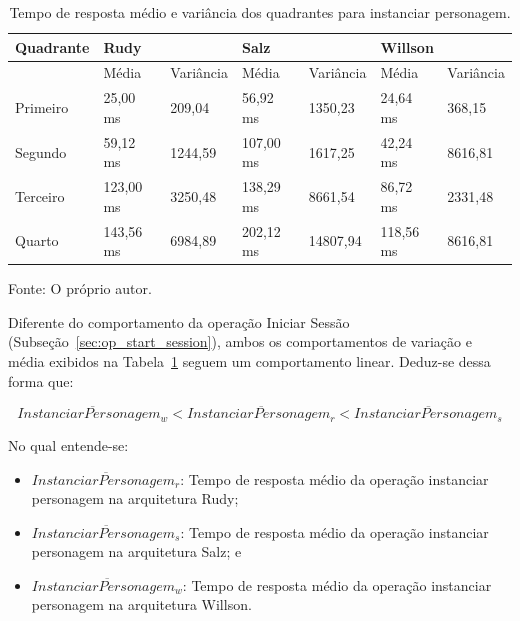 \begin{table}[htb!]
\centering
\begin{adjustbox}{max width=\textwidth}
\caption{Tempo de resposta médio e variância dos quadrantes para instanciar personagem.}
\label{tab:op_spawn_character}
\begin{tabular}{l||l|l||l|l||l|l}

\hline \hline

Quadrante & \multicolumn{2}{l||}{Rudy}    & \multicolumn{2}{l||}{Salz}    & \multicolumn{2}{l}{Willson} \\ \hline \hline

& Média & Variância & Média & Variância & Média & Variância \\ \hline

Primeiro  & 25,00 ms & 209,04 & 56,92 ms & 1350,23 & 24,64 ms & 368,15 \\ \hline

Segundo  & 59,12 ms & 1244,59 & 107,00 ms & 1617,25 & 42,24 ms & 8616,81 \\ \hline

Terceiro  & 123,00 ms & 3250,48 & 138,29 ms & 8661,54 & 86,72 ms & 2331,48 \\ \hline

Quarto  & 143,56 ms & 6984,89 & 202,12 ms & 14807,94 & 118,56 ms & 8616,81 \\ \hline \hline

\end{tabular}

\end{adjustbox}

Fonte: O próprio autor.
\end{table}

Diferente do comportamento da operação Iniciar Sessão (Subseção~\ref{sec:op_start_session}), ambos os comportamentos de variação e média exibidos na Tabela~\ref{tab:op_spawn_character} seguem um comportamento linear.
%
Deduz-se dessa forma que:

$$
  \overline{InstanciarPersonagem_{w}} < \overline{InstanciarPersonagem_{r}} <\overline{InstanciarPersonagem_{s}}
$$

No qual entende-se:

\begin{itemize}
 \item $\overline{InstanciarPersonagem_{r}}$: Tempo de resposta médio da operação instanciar personagem na arquitetura Rudy;
 \item $\overline{InstanciarPersonagem_{s}}$: Tempo de resposta médio da operação instanciar personagem na arquitetura Salz; e
 \item $\overline{InstanciarPersonagem_{w}}$: Tempo de resposta médio da operação instanciar personagem na arquitetura Willson.
\end{itemize}


